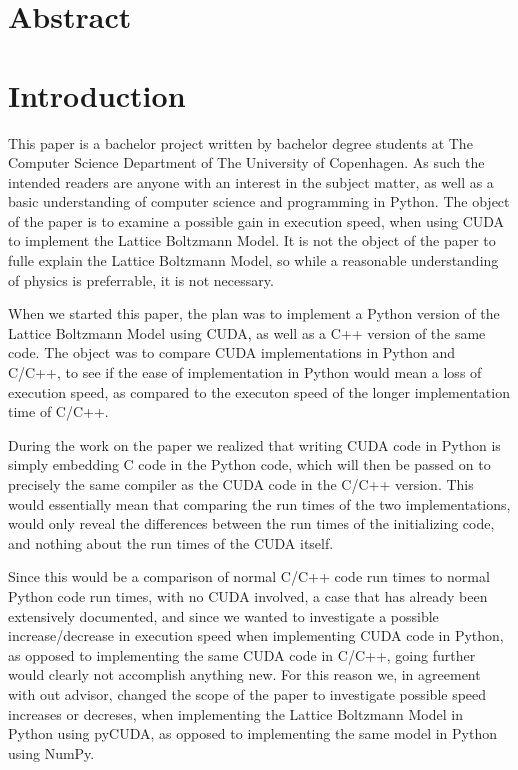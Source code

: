 
\section*{Abstract}


\newpage
\tableofcontents
\newpage

\section{Introduction}

This paper is a bachelor project written by bachelor degree students at The Computer Science Department of The University of Copenhagen. As such the intended readers are anyone with an interest in the subject matter, as well as a basic understanding of computer science and programming in Python. The object of the paper is to examine a possible gain in execution speed, when using CUDA to implement the Lattice Boltzmann Model. It is not the object of the paper to fulle explain the Lattice Boltzmann Model, so while a reasonable understanding of physics is preferrable, it is not necessary.

When we started this paper, the plan was to implement a Python version of the Lattice Boltzmann Model using CUDA, as well as a C++ version of the same code. The object was to compare CUDA implementations in Python and C/C++, to see if the ease of implementation in Python would mean a loss of execution speed, as compared to the executon speed of the longer implementation time of C/C++.

During the work on the paper we realized that writing CUDA code in Python is simply embedding C code in the Python code, which will then be passed on to precisely the same compiler as the CUDA code in the C/C++ version. This would essentially mean that comparing the run times of the two implementations, would only reveal the differences between the run times of the initializing code, and nothing about the run times of the CUDA itself.

Since this would be a comparison of normal C/C++ code run times to normal Python code run times, with no CUDA involved, a case that has already been extensively documented, and since we wanted to investigate a possible increase/decrease in execution speed when implementing CUDA code in Python, as opposed to implementing the same CUDA code in C/C++, going further would clearly not accomplish anything new. For this reason we, in agreement with out advisor, changed the scope of the paper to investigate possible speed increases or decreses, when implementing the Lattice Boltzmann Model in Python using pyCUDA, as opposed to implementing the same model in Python using NumPy.

